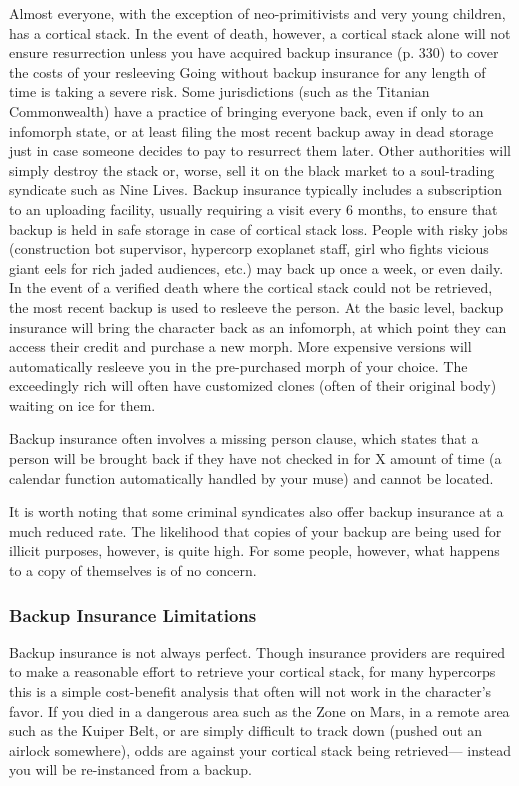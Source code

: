 Almost everyone, with the exception of neo-primitivists 
and very young children, has a cortical stack. In the 
event of death, however, a cortical stack alone will not 
ensure resurrection unless you have acquired backup 
insurance (p. 330) to cover the costs of your resleeving
Going without backup insurance for any length of
time is taking a severe risk. Some jurisdictions (such 
as the Titanian Commonwealth) have a practice of 
bringing everyone back, even if only to an infomorph 
state, or at least filing the most recent backup away 
in dead storage just in case someone decides to pay 
to resurrect them later. Other authorities will simply 
destroy the stack or, worse, sell it on the black market 
to a soul-trading syndicate such as Nine Lives.
Backup insurance typically includes a subscription 
to an uploading facility, usually requiring a visit every 
6 months, to ensure that backup is held in safe storage
in case of cortical stack loss. People with risky
jobs (construction bot supervisor, hypercorp exoplanet
staff, girl who fights vicious giant eels for rich
jaded audiences, etc.) may back up once a week, or 
even daily. In the event of a verified death where the 
cortical stack could not be retrieved, the most recent 
backup is used to resleeve the person.
At the basic level, backup insurance will bring the 
character back as an infomorph, at which point they 
can access their credit and purchase a new morph. 
More expensive versions will automatically resleeve 
you in the pre-purchased morph of your choice. The 
exceedingly rich will often have customized clones 
(often of their original body) waiting on ice for them.

Backup insurance often involves a missing person 
clause, which states that a person will be brought 
back if they have not checked in for X amount of time 
(a calendar function automatically handled by your 
muse) and cannot be located.

It is worth noting that some criminal syndicates 
also offer backup insurance at a much reduced rate. 
The likelihood that copies of your backup are being 
used for illicit purposes, however, is quite high. For 
some people, however, what happens to a copy of 
themselves is of no concern.

\subsubsection{Backup Insurance Limitations}

Backup insurance is not always perfect. Though insurance
providers are required to make a reasonable
effort to retrieve your cortical stack, for many hypercorps
this is a simple cost-benefit analysis that often
will not work in the character's favor. If you died in a 
dangerous area such as the Zone on Mars, in a remote 
area such as the Kuiper Belt, or are simply difficult 
to track down (pushed out an airlock somewhere), 
odds are against your cortical stack being retrieved—
instead you will be re-instanced from a backup.

